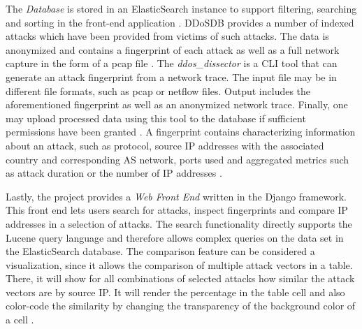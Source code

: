 The \emph{Database} is stored in an ElasticSearch instance to support filtering, searching and sorting in the front-end application \cite{ddosdb-help}.
DDoSDB provides a number of indexed attacks which have been provided from victims of such attacks. The data is anonymized and contains a fingerprint of each attack as well as a full network capture in the form of a pcap file \cite{ddos_dissector}.
The \emph{ddos\_dissector} is a CLI tool that can generate an attack fingerprint from a network trace. The input file may be in different file formats, such as pcap or netflow files.
Output includes the aforementioned fingerprint as well as an anonymized network trace. Finally, one may upload processed data using this tool to the database if sufficient permissions have been granted \cite{ddos_dissector}.
A fingerprint contains characterizing information about an attack, such as protocol, source IP addresses with the associated country and corresponding AS network, ports used and aggregated metrics such as attack duration or the number of IP addresses \cite{ddosdb-help}.

Lastly, the project provides a \emph{Web Front End} written in the Django framework. This front end lets users search for attacks, inspect fingerprints and compare IP addresses in a selection of attacks.
The search functionality directly supports the Lucene query language and therefore allows complex queries on the data set in the ElasticSearch database.
The comparison feature can be considered a visualization, since it allows the comparison of multiple attack vectors in a table. There, it will show for all combinations of selected attacks how similar the attack vectors are by source IP. It will render the percentage in the table cell and also color-code the similarity by changing the transparency of the background color of a cell \cite{ddosdb-help}.


